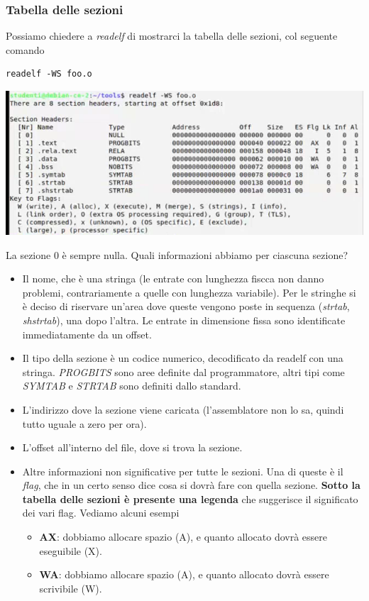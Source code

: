 \documentclass[11pt]{report}
\theoremstyle{definition}
\begin{document}
\subsubsection{Tabella delle sezioni} Possiamo chiedere a \emph{readelf} di mostrarci la tabella delle sezioni, col seguente comando
\begin{verbatim}
readelf -WS foo.o
\end{verbatim}\begin{center}
\includegraphics[scale=.9]{img/54.PNG}
\end{center}  
La sezione 0 è sempre nulla. Quali informazioni abbiamo per ciascuna sezione?
\begin{itemize}
\item Il nome, che è una stringa (le entrate con lunghezza fiscca non danno problemi, contrariamente a quelle con lunghezza variabile). Per le stringhe si è deciso di riservare un'area dove queste vengono poste in sequenza (\emph{strtab}, \emph{shstrtab}), una dopo l'altra. Le entrate in dimensione fissa sono identificate immediatamente da un offset.
\item Il tipo della sezione è un codice numerico, decodificato da readelf con una stringa. \emph{PROGBITS} sono aree definite dal programmatore, altri tipi come \emph{SYMTAB} e \emph{STRTAB} sono definiti dallo standard.
\item L'indirizzo dove la sezione viene caricata (l'assemblatore non lo sa, quindi tutto uguale a zero per ora).
\item L'offset all'interno del file, dove si trova la sezione.
\item Altre informazioni non significative per tutte le sezioni. Una di queste è il \emph{flag}, che in un certo senso dice cosa si dovrà fare con quella sezione. \textbf{Sotto la tabella delle sezioni è presente una legenda} che suggerisce il significato dei vari flag. Vediamo alcuni esempi
\begin{itemize}
\item \textbf{AX}: dobbiamo allocare spazio (A), e quanto allocato dovrà essere eseguibile (X).
\item \textbf{WA}: dobbiamo allocare spazio (A), e quanto allocato dovrà essere scrivibile (W).
\end{itemize}
\end{itemize}
\end{document}
